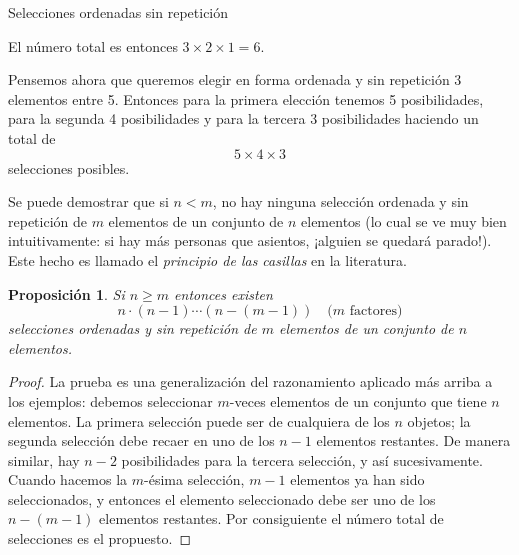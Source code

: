 \documentclass[11pt,spanish,makeidx]{amsbook}
\newtheorem{proposicion}[teorema]{Proposici\'on}
\theoremstyle{definition}
\theoremstyle{remark}
\newcommand\ponertz[3]{\node at (#1/10,#2/10+3) {#3};} %
\newcommand\lineatz[4]{\draw (#1/10,#2/10+3)-- (#3/10,#4/10+3);} %
\begin{document}
\begin{section}{Selecciones ordenadas sin repetición}

El número total es entonces $3 \times 2 \times 1 = 6$.

Pensemos ahora que queremos elegir en forma ordenada y sin repetición 3 elementos entre 5. Entonces para la primera elección tenemos 5 posibilidades, para la segunda 4 posibilidades y para la tercera 3 posibilidades haciendo un total de 
$$
5 \times 4 \times 3
$$
selecciones posibles. 

Se puede demostrar que si $n < m$, no hay ninguna selección ordenada y  sin repetición de $m$ elementos  de un conjunto de $n$ elementos (lo cual se ve muy bien intuitivamente: si hay más personas que asientos, ¡alguien se quedará parado!). Este hecho es llamado el {\em principio de las casillas} en la literatura.

\begin{proposicion}\label{prop1}
Si $n \ge m$ entonces existen
\begin{equation}\label{ordsinrep}
 n \cdot (n - 1) \cdots (n - (m - 1)) \quad \text{($m$ factores)}
\end{equation}
selecciones ordenadas y sin repetición de $m$ elementos de un conjunto de $n$ elementos.
\end{proposicion}
\begin{proof} La prueba es una generalización del razonamiento aplicado más arriba a los ejemplos: debemos seleccionar $m$-veces elementos de un conjunto que tiene $n$ elementos. La primera selección puede ser de cualquiera de los $n$ objetos; la segunda selección debe recaer en uno de los $n-1$ elementos restantes. De manera similar, hay $n-2$ posibilidades para la tercera selección, y así sucesivamente. Cuando hacemos la $m$-ésima selección, $m-1$ elementos ya han sido seleccionados, y entonces el elemento seleccionado debe ser uno de los $n-(m-1)$ elementos restantes. Por consiguiente el número total de selecciones es el propuesto. 
\end{proof}


\end{section}
\end{document}
